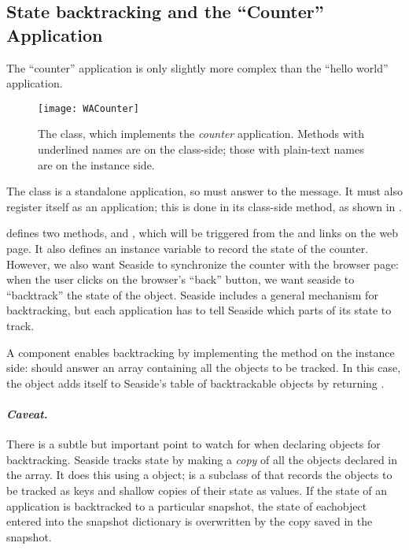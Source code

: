 \documentclass[a4paper,10pt,twoside]{book}
\begin{document}
\subsection{State backtracking and the ``Counter'' Application}

The ``counter'' application is only slightly more complex than the ``hello world''
application.

\begin{figure}[ht]
\begin{center}
\texttt{[image: WACounter]}
\caption{The  class, which implements the \emph{counter} application.
Methods with underlined names are on the class-side; those with plain-text names are on
the instance side.}
\end{center}
\end{figure}

The class  is a standalone application, so  must
answer  to the  message.
It must also register itself as an application; this is done in its class-side
 method, as shown in .

 defines two methods,  and , which will be
triggered from the \link{++} and \link{--\,--} links on the web page.
It also defines an instance variable  to record the state of the counter.
However, we also want Seaside to synchronize the counter with the browser page:
when the user clicks on the browser's ``back'' button, we want seaside to ``backtrack''
the state of the  object.
Seaside includes a general mechanism for backtracking, but each application has to tell
Seaside which parts of its state to track.

A component enables backtracking by implementing the  method on the instance
side:
 should answer an array containing all the objects to be tracked.
In this case, the  object adds itself to Seaside's table of backtrackable
objects by returning .

\paragraph{\emph{Caveat.}}
There is a subtle but important point to watch for when declaring objects for
backtracking.
Seaside tracks state by making a \emph{copy} of all the objects declared in the
 array.
It does this using a  object;  is a subclass of
 that records the objects to be tracked as keys and shallow
copies of their state as values.
If the state of an application is backtracked to a particular snapshot, the state of eachobject entered into the snapshot dictionary is overwritten by the copy saved in the
snapshot.
\end{document}
